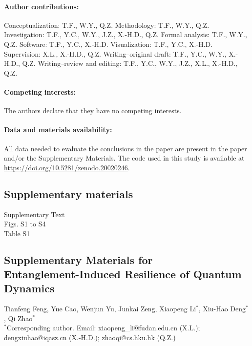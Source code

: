 \documentclass[12pt]{article}
\def\scititle{Entanglement-Induced Resilience of Quantum Dynamics}
\begin{document}
\paragraph*{Author contributions:}
Conceptualization: T.F., W.Y., Q.Z.
Methodology: T.F., W.Y., Q.Z.
Investigation: T.F., Y.C., W.Y., J.Z., X.-H.D., Q.Z.
Formal analysis: T.F., W.Y., Q.Z.
Software: T.F., Y.C., X.-H.D.
Visualization: T.F., Y.C., X.-H.D.
Supervision: X.L., X.-H.D., Q.Z.
Writing--original draft: T.F., Y.C., W.Y., X.-H.D., Q.Z.
Writing--review and editing: T.F., Y.C., W.Y., J.Z., X.L., X.-H.D., Q.Z.

\paragraph*{Competing interests:}
The authors declare that they have no competing interests.

\paragraph*{Data and materials availability:}
All data needed to evaluate the conclusions in the paper are present in the paper and/or the Supplementary Materials. The code used in this study is available at \url{https://doi.org/10.5281/zenodo.20020246}.


\subsection*{Supplementary materials}
Supplementary Text\\
Figs. S1 to S4\\
Table S1

\newpage

\renewcommand{\thefigure}{S\arabic{figure}}
\renewcommand{\thetable}{S\arabic{table}}
\renewcommand{\theequation}{S\arabic{equation}}
\renewcommand{\thepage}{S\arabic{page}}
\setcounter{figure}{0}
\setcounter{table}{0}
\setcounter{equation}{0}
\setcounter{page}{1}

\begin{center}
\section*{Supplementary Materials for\\ \scititle}

Tianfeng Feng, Yue Cao, Wenjun Yu, Junkai Zeng, Xiaopeng Li$^\ast$, Xiu-Hao Deng$^\ast$, Qi Zhao$^\ast$\\
\small$^\ast$Corresponding author. Email: xiaopeng\_li@fudan.edu.cn (X.L.); dengxiuhao@iqasz.cn (X.-H.D.); zhaoqi@cs.hku.hk (Q.Z.)

\end{center}
\end{document}
